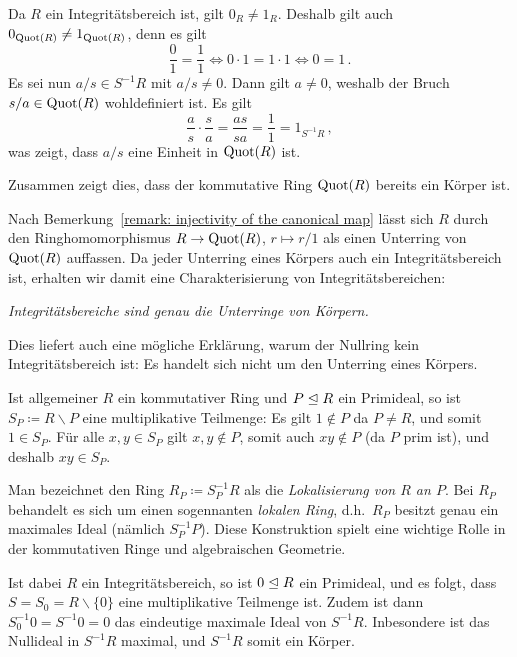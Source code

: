 Da $R$ ein Integritätsbereich ist, gilt $0_R \neq 1_R$.
Deshalb gilt auch $0_{\operatorname{Quot}(R)} \neq 1_{\operatorname{Quot}(R)}$, denn es gilt
\[
        \frac{0}{1} = \frac{1}{1}
  \iff  0 \cdot 1 = 1 \cdot 1
  \iff  0 = 1 \,.
\]
Es sei nun $a/s \in S^{-1} R$ mit $a/s \neq 0$.
Dann gilt $a \neq 0$, weshalb der Bruch $s/a \in \operatorname{Quot}(R)$ wohldefiniert ist.
Es gilt
\[
    \frac{a}{s} \cdot \frac{s}{a}
  = \frac{as}{sa}
  = \frac{1}{1}
  = 1_{S^{-1} R} \,,
\]
was zeigt, dass $a/s$ eine Einheit in $\operatorname{Quot}(R)$ ist.

Zusammen zeigt dies, dass der kommutative Ring $\operatorname{Quot}(R)$ bereits ein Körper ist.

\begin{remark}
  Nach Bemerkung~\ref{remark: injectivity of the canonical map} lässt sich $R$ durch den Ringhomomorphismus $R \to \operatorname{Quot}(R)$, $r \mapsto r/1$ als einen Unterring von $\operatorname{Quot}(R)$ auffassen.
  Da jeder Unterring eines Körpers auch ein Integritätsbereich ist, erhalten wir damit eine Charakterisierung von Integritätsbereichen:
  \begin{center}
    \emph{Integritätsbereiche sind genau die Unterringe von Körpern.}
  \end{center}
  
  Dies liefert auch eine mögliche Erklärung, warum der Nullring kein Integritätsbereich ist:
  Es handelt sich nicht um den Unterring eines Körpers.
\end{remark}

\begin{remark}
  Ist allgemeiner $R$ ein kommutativer Ring und $P \trianglelefteq R$ ein Primideal, so ist $S_P \coloneqq R \smallsetminus P$ eine multiplikative Teilmenge:
  Es gilt $1 \notin P$ da $P \neq R$, und somit $1 \in S_P$.
  Für alle $x, y \in S_P$ gilt $x, y \notin P$, somit auch $xy \notin P$ (da $P$ prim ist), und deshalb $xy \in S_P$.
  
  Man bezeichnet den Ring $R_P \coloneqq S_P^{-1} R$ als die \emph{Lokalisierung von $R$ an $P$}.
  Bei $R_P$ behandelt es sich um einen sogennanten \emph{lokalen Ring}, d.h.\ $R_P$ besitzt genau ein maximales Ideal (nämlich $S_P^{-1} P$).
  Diese Konstruktion spielt eine wichtige Rolle in der kommutativen Ringe und algebraischen Geometrie.
  
  Ist dabei $R$ ein Integritätsbereich, so ist $0 \trianglelefteq R$ ein Primideal, und es folgt, dass $S = S_0 = R \smallsetminus \{0\}$ eine multiplikative Teilmenge ist.
  Zudem ist dann $S_0^{-1} 0 = S^{-1} 0 = 0$ das eindeutige maximale Ideal von $S^{-1} R$.
  Inbesondere ist das Nullideal in $S^{-1} R$ maximal, und $S^{-1} R$ somit ein Körper.
\end{remark}






